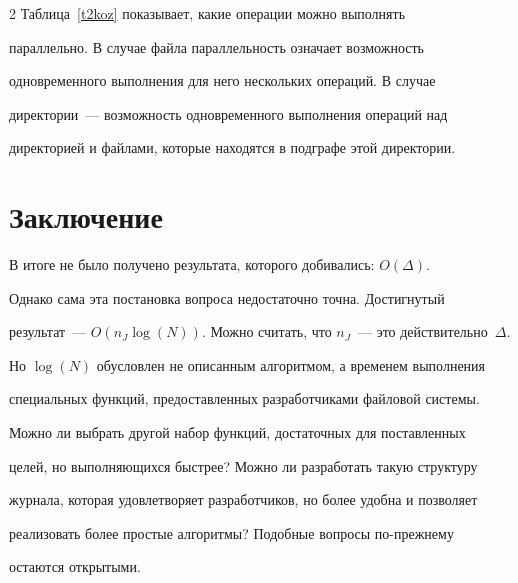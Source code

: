 \begin{multicols}{2}
      Таблица~\ref{t2koz} показывает, какие операции можно выполнять 


параллельно. В случае файла параллельность означает возможность 


одновременного выполнения для него нескольких операций. В случае 


директории~--- возможность одновременного выполнения операций над 


директорией и файлами, которые находятся в подграфе этой директории. 


      





\vspace*{-6pt}


\section{Заключение}


\vspace*{1pt}





В итоге не было получено результата, которого добивались: $O(\Delta )$. 


Однако сама эта постановка вопроса недостаточно точна.   Достигнутый 


результат~--- $O(n_J \log(N))$.  Можно считать, что $n_J$~--- это действительно~$\Delta$. 


Но $\log (N)$ обусловлен не описанным алгоритмом, а временем выполнения 


специальных функций, предоставленных разработчиками файловой системы. 


Можно ли выбрать другой набор функций,  достаточных для поставленных 


целей, но выполняющихся быстрее? Можно ли разработать такую структуру 


журнала, которая удовлетворяет разработчиков, но более удобна и позволяет 


реализовать более простые алгоритмы? Подобные вопросы по-прежнему 


остаются открытыми.













{\small\frenchspacing


}
\end{multicols}
